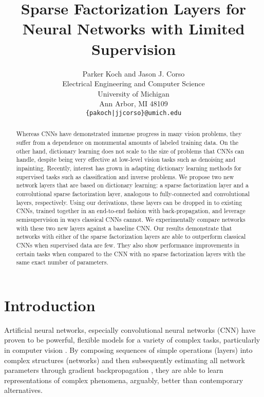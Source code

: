 \documentclass[10pt,twocolumn,letterpaper]{article}
\begin{document}
\title{Sparse Factorization Layers for Neural Networks with Limited Supervision}

\author{Parker Koch and Jason J. Corso\\
Electrical Engineering and Computer Science\\
University of Michigan\\
Ann Arbor, MI 48109\\
{\tt\small \{pakoch|jjcorso\}@umich.edu}
}

\maketitle

\begin{abstract}

Whereas CNNs have demonstrated immense progress in many vision problems, they 
    suffer from a dependence on monumental amounts 
    of labeled training data. On the other hand, dictionary learning does not scale to 
    the size of problems that CNNs can handle, despite being very effective at 
    low-level vision tasks such as denoising and inpainting. Recently, interest 
    has grown in adapting dictionary learning methods for supervised tasks such 
    as classification and inverse problems.  We propose two new network layers 
    that are based on dictionary learning: a sparse factorization layer and a 
    convolutional sparse factorization layer, analogous to fully-connected and 
    convolutional layers, respectively.
    Using our derivations, these layers can be dropped in to existing CNNs, 
    trained together in an end-to-end fashion with back-propagation, and 
    leverage semisupervision in ways classical CNNs cannot.  
    We experimentally compare networks with these two new layers against a baseline CNN.  Our results demonstrate that networks with either of the sparse factorization layers are able to outperform classical CNNs when supervised data are few.  They also show performance improvements in certain tasks when compared to the CNN with no sparse factorization layers with the same exact number of parameters.

\end{abstract}

\section{Introduction}

Artificial neural networks, especially convolutional neural networks (CNN) \cite{LeBoBeIEEE1998} have proven to be powerful, flexible models \cite{HeZhReCVPR2016,SiZiICLR2015,KrSuHiNIPS2012} for a variety of complex tasks, particularly in computer vision \cite{RuDeSuIJCV2015,JoKaFeCVPR2016,OhGuLeNIPS2015}. By composing sequences of simple operations (layers) into complex structures (networks) and then subsequently estimating all network parameters through gradient backpropagation \cite{lecun2012efficient}, they are able to learn representations of complex phenomena, arguably, better than contemporary alternatives.
\end{document}
